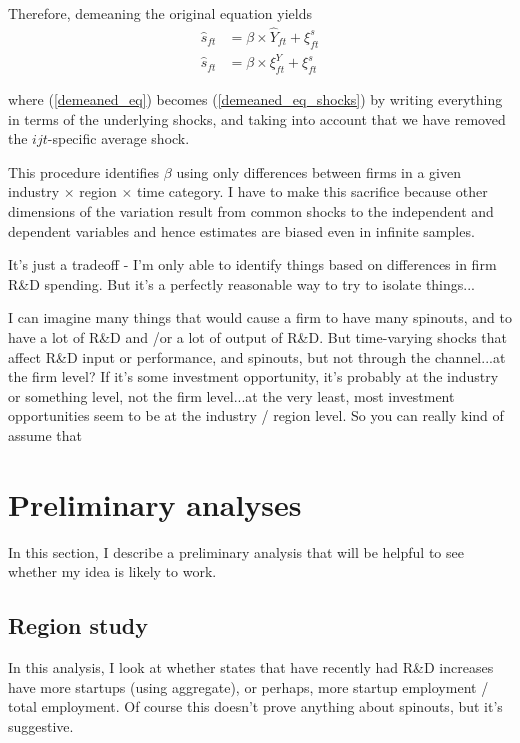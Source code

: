 \documentclass[12pt,english]{article}
\theoremstyle{remark}
\begin{document}
Therefore, demeaning the original equation yields
\begin{align}
	\hat{s}_{ft} &= \beta \times \hat{Y}_{ft} + \xi^s_{ft} \label{demeaned_eq} \\
	\hat{s}_{ft} &= \beta \times \xi^Y_{ft} + \xi^s_{ft}  \label{demeaned_eq_shocks}
\end{align}

where (\ref{demeaned_eq}) becomes (\ref{demeaned_eq_shocks}) by writing everything in terms of the underlying shocks, and taking into account that we have removed the $ijt$-specific average shock. 

This procedure identifies $\beta$ using only differences between firms in a given industry $\times$ region $\times$ time category. I have to make this sacrifice because other dimensions of the variation result from common shocks to the independent and dependent variables and hence estimates are biased even in infinite samples.

It's just a tradeoff - I'm only able to identify things based on differences in firm R\&D spending. But it's a perfectly reasonable way to try to isolate things...

I can imagine many things that would cause a firm to have many spinouts, and to have a lot of R\&D and /or a lot of output of R\&D. But time-varying shocks that affect R\&D input or performance, and spinouts, but not through the channel...at the firm level? If it's some investment opportunity, it's probably at the industry or something level, not the firm level...at the very least, most investment opportunities seem to be at the industry / region level. So you can really kind of assume that 

\section{Preliminary analyses}

In this section, I describe a preliminary analysis that will be helpful to see whether my idea is likely to work. 

\subsection{Region study}

In this analysis, I look at whether states that have recently had R\&D increases have more startups (using aggregate), or perhaps, more startup employment / total employment. Of course this doesn't prove anything about spinouts, but it's suggestive.
\end{document}
